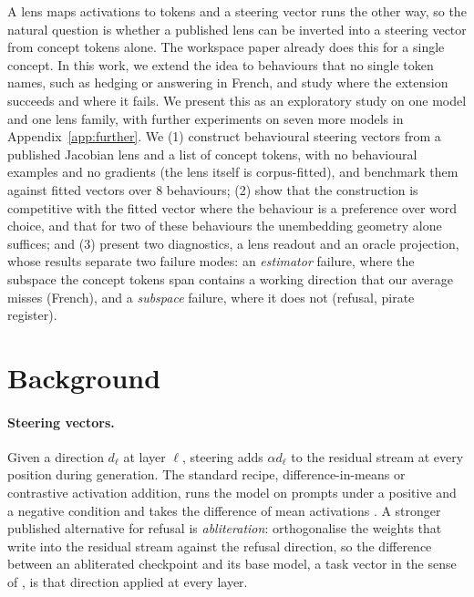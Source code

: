\documentclass{article}
\begin{document}
A lens maps activations to tokens and a steering vector runs the other way, so the natural question is whether a published lens can be inverted into a steering vector from concept tokens alone. The workspace paper already does this for a single concept. In this work, we extend the idea to behaviours that no single token names, such as hedging or answering in French, and study where the extension succeeds and where it fails. We present this as an exploratory study on one model and one lens family, with further experiments on seven more models in Appendix~\ref{app:further}. We (1) construct behavioural steering vectors from a published Jacobian lens and a list of concept tokens, with no behavioural examples and no gradients (the lens itself is corpus-fitted), and benchmark them against fitted vectors over 8 behaviours; (2) show that the construction is competitive with the fitted vector where the behaviour is a preference over word choice, and that for two of these behaviours the unembedding geometry alone suffices; and (3) present two diagnostics, a lens readout and an oracle projection, whose results separate two failure modes: an \emph{estimator} failure, where the subspace the concept tokens span contains a working direction that our average misses (French), and a \emph{subspace} failure, where it does not (refusal, pirate register).

\section{Background}

\paragraph{Steering vectors.}
Given a direction $d_\ell$ at layer $\ell$, steering adds $\alpha d_\ell$ to the residual stream at every position during generation. The standard recipe, difference-in-means or contrastive activation addition, runs the model on prompts under a positive and a negative condition and takes the difference of mean activations \citep{rimsky2024caa}. A stronger published alternative for refusal is \emph{abliteration}: \citet{arditi2024refusal} orthogonalise the weights that write into the residual stream against the refusal direction, so the difference between an abliterated checkpoint and its base model, a task vector in the sense of \citet{ilharco2023task}, is that direction applied at every layer.
\end{document}
